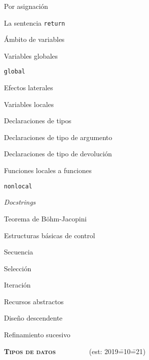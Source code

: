 \begin{longenum}
\begin{longenum}
\begin{longenum}
\begin{longenum}
                \item Por asignación
            \end{longenum}
            \item La sentencia \texttt{return}
            \item Ámbito de variables
            \begin{longenum}
                \item Variables globales
                \begin{longenum}
                    \item \texttt{global}
                    \item Efectos laterales
                \end{longenum}
                \item Variables locales
            \end{longenum}
            \item Declaraciones de tipos
            \begin{longenum}
                \item Declaraciones de tipo de argumento
                \item Declaraciones de tipo de devolución
            \end{longenum}
            \item Funciones locales a funciones
            \begin{longenum}
                \item \texttt{nonlocal}
            \end{longenum}
            \item \textit{Docstrings}
        \end{longenum}
        \item Teorema de Böhm-Jacopini
        \item Estructuras básicas de control
        \begin{longenum}
            \item Secuencia
            \item Selección
            \item Iteración
        \end{longenum}
        \item Recursos abstractos
        \item Diseño descendente
        \item Refinamiento sucesivo
    \end{longenum}
    \item \textbf{\textsc{Tipos de datos}} \ \ \ \ \ \ \ \ \ (est: 2019\==10\==21)

\end{longenum}
